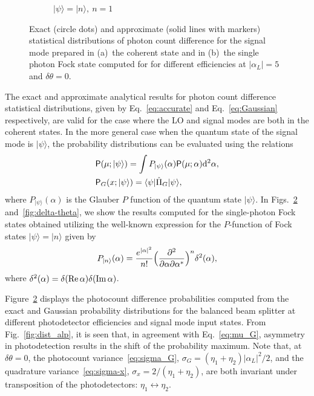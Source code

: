 \documentclass[%
reprint,
superscriptaddress,
 amsmath,amssymb,amsfonts,
 aps,
 pra,
 longbibliography
]{revtex4-2}
\newcommand{\ket}[1]{\ensuremath{|{#1}\rangle}}
\newcommand{\bra}[1]{\ensuremath{\langle{#1}|}}
\newcommand{\cnj}[1]{{#1}^{\ast}}
\renewcommand{\Re}{\mathop{\rm Re}\nolimits}
\renewcommand{\Im}{\mathop{\rm Im}\nolimits}
\newcommand{\prob}{\mathsf{P}}
\newcommand{\dd}{\mathrm{d}}
\begin{document}
\begin{figure}
\begin{subfigure}[]{.45\textwidth}
\caption[]{$\ket{\psi}=\ket{n},\:n=1$}
\label{fig:dist_fock}
\end{subfigure}
\caption{Exact (circle dots) and approximate (solid lines with markers) statistical distributions of photon count difference
  for the signal mode prepared in (a)~the coherent state and
  in (b)~the single photon Fock state computed for
  for different efficiencies  at $|\alpha_L|=5$
  and $\delta\theta=0$.
}
\label{fig:dist-hom}
\end{figure}



The exact and approximate analytical results for photon count difference statistical distributions, given by Eq.~\eqref{eq:accurate} and Eq.~\eqref{eq:Gaussian} respectively, are valid
for the case where the LO and signal modes are both
in the coherent states. In the more general case when the quantum state of the signal mode
is $\ket{\psi}$,
the probability distributions can be evaluated
using the relations
\begin{align}
  &
\label{eq:average-P-func}
    \prob(\mu;\ket{\psi})=\int  P_{\ket{\psi}}(\alpha)\prob(\mu;\alpha)\dd^2\alpha,
    \notag
  \\
  &
    \prob_G(x;\ket{\psi})=\bra{\psi}\hat{\Pi}_G\ket{\psi},
\end{align}
where $P_{\ket{\psi}}(\alpha)$ is the Glauber $P$ function of the quantum state
$\ket{\psi}$.
In Figs.~\ref{fig:dist-hom}
and~\ref{fig:delta-theta},
we show the results computed for the single-photon Fock states
obtained utilizing
the well-known expression for
the $P$-function of Fock states $\ket{\psi}=\ket{n}$ given by
\begin{equation}
\label{eq:P-function_fock}
P_{\ket{n}}(\alpha)=
\frac{e^{|\alpha|^2}}{n!}
\Bigl(
\frac{\partial^2}{\partial\alpha\partial\cnj{\alpha}}
\Bigr)^n
\delta^{2}(\alpha),
\end{equation}
where $\delta^{2}(\alpha)=\delta(\Re\alpha)\delta(\Im\alpha)$.

Figure~\ref{fig:dist-hom} displays
the photocount difference probabilities
computed from
the exact and Gaussian probability distributions
for the balanced beam splitter at different photodetector efficiencies
and signal mode input states.
From Fig.~\ref{fig:dist_alp},
it is seen that,
in agreement with Eq.~\eqref{eq:mu_G},
asymmetry in photodetection
results in the shift of the probability maximum.
Note that, at $\delta\theta=0$,
the photocount variance~\eqref{eq:sigma_G},
$\sigma_G=(\eta_1+\eta_2)|\alpha_L|^2/2$, and
the quadrature variance~\eqref{eq:sigma-x},
$\sigma_x=2/(\eta_1+\eta_2)$,
are both invariant under transposition of the photodetectors:
$\eta_{1}\leftrightarrow \eta_{2}$.
\end{document}
